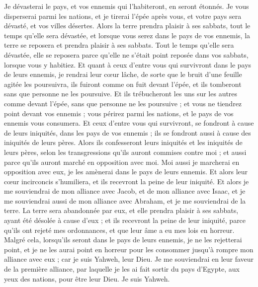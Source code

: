 \begin{multicols}{2}
Je dévasterai le pays, et vos ennemis qui l’habiteront, en seront étonnés.
Je vous disperserai parmi les nations, et je tirerai l'épée après vous, et votre pays sera dévasté, et vos villes désertes.
Alors la terre prendra plaisir à ses sabbats, tout le temps qu’elle sera dévastée, et lorsque vous serez dans le pays de vos ennemis, la terre se reposera et prendra plaisir à ses sabbats.
Tout le temps qu’elle sera dévastée, elle se reposera parce qu’elle ne s'était point reposée dans vos sabbats, lorsque vous y habitiez.
Et quant à ceux d’entre vous qui survivront dans le pays de leurs ennemis, je rendrai leur cœur lâche, de sorte que le bruit d'une feuille agitée les poursuivra, ils fuiront comme on fuit devant l'épée, et ils tomberont sans que personne ne les poursuive.
Et ils trébucheront les uns sur les autres comme devant l'épée, sans que personne ne les poursuive ; et vous ne tiendrez point devant vos ennemis ;
vous périrez parmi les nations, et le pays de vos ennemis vous consumera.
Et ceux d'entre vous qui survivront, se fondront à cause de leurs iniquités, dans les pays de vos ennemis ; ils se fondront aussi à cause des iniquités de leurs pères.
Alors ils confesseront leurs iniquités et les iniquités de leurs pères, selon les transgressions qu'ils auront commises contre moi ; et aussi parce qu'ils auront marché en opposition avec moi.
Moi aussi je marcherai en opposition avec eux, je les amènerai dans le pays de leurs ennemis. Et alors leur cœur incirconcis s'humiliera, et ils recevront la peine de leur iniquité.
Et alors je me souviendrai de mon alliance avec Jacob, et de mon alliance avec Isaac, et je me souviendrai aussi de mon alliance avec Abraham, et je me souviendrai de la terre.
La terre sera abandonnée par eux, et elle prendra plaisir à ses sabbats, ayant été désolée à cause d'eux ; et ils recevront la peine de leur iniquité, parce qu'ils ont rejeté mes ordonnances, et que leur âme a eu mes lois en horreur.
Malgré cela, lorsqu'ils seront dans le pays de leurs ennemis, je ne les rejetterai point, et je ne les aurai point en horreur pour les consommer jusqu’à rompre mon alliance avec eux ; car je suis Yahweh, leur Dieu.
Je me souviendrai en leur faveur de la première alliance, par laquelle je les ai fait sortir du pays d'Egypte, aux yeux des nations, pour être leur Dieu. Je suis Yahweh.

\end{multicols}
